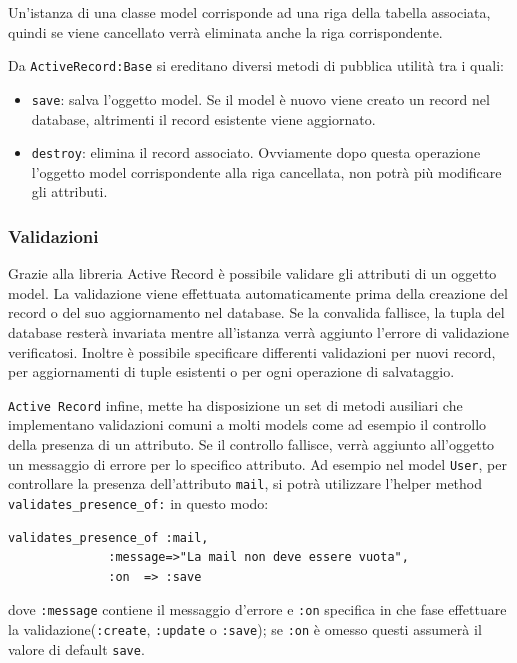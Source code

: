 \documentclass[11pt,a4paper]{article}
\begin{document}
Un'istanza di una classe model corrisponde ad una riga della tabella associata, quindi se viene cancellato verrà eliminata anche la riga corrispondente.

Da \verb|ActiveRecord:Base| si ereditano diversi metodi di pubblica utilità tra i quali:
\begin{itemize}
 \item \verb|save|: salva l'oggetto model. Se il model è nuovo viene creato un record nel database, altrimenti il record esistente viene aggiornato.
 \item \verb|destroy|: elimina il record associato. Ovviamente dopo questa operazione l'oggetto model corrispondente alla riga cancellata, non potrà più modificare gli attributi.
\end{itemize}
\subsubsection*{Validazioni}
Grazie alla libreria Active Record è possibile validare gli attributi di un oggetto model. La validazione viene effettuata automaticamente prima della creazione del record o del suo aggiornamento nel database. Se la convalida fallisce, la tupla del database resterà invariata mentre all'istanza verrà aggiunto l'errore di validazione verificatosi. Inoltre è possibile specificare differenti validazioni per nuovi record, per aggiornamenti di tuple esistenti o per ogni operazione di salvataggio.

\verb|Active Record| infine, mette ha disposizione un set di metodi ausiliari che implementano validazioni comuni a molti models come ad esempio il controllo della presenza di un attributo. Se il controllo fallisce, verrà aggiunto all'oggetto un messaggio di errore per lo specifico attributo.
Ad esempio nel model \verb|User|, per controllare la presenza dell'attributo \verb|mail|, si potrà utilizzare l'helper method \verb|validates_presence_of:| in questo modo:\\
\begin{verbatim}
validates_presence_of :mail,
		      :message=>"La mail non deve essere vuota",
		      :on  => :save
\end{verbatim}
dove \verb|:message| contiene il messaggio d'errore e \verb|:on| specifica in che fase effettuare la validazione(\verb|:create|, \verb|:update| o \verb|:save|); se \verb|:on| è omesso questi assumerà il valore di default \verb|save|.
\end{document}
